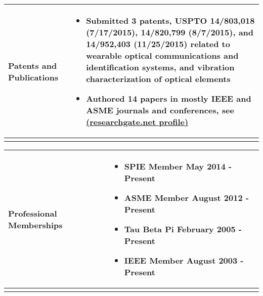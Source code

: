 \documentclass{article}[16pt]
\newlength{\lcolw}
\newlength{\rcolw}
\newlength{\hlcolw}
\newlength{\itemmargin}
\begin{document}
\begin{tabular}{L{\hlcolw}  L{\rcolw}}
\textbf{\Large Patents and Publications} & 
\vspace{-0.3in} 
 \begin{itemize}[leftmargin = \itemmargin]

	\item Submitted 3 patents, USPTO 14/803,018 (7/17/2015), 14/820,799 (8/7/2015), and 14/952,403 (11/25/2015) related to wearable optical communications and identification systems, and vibration characterization of optical elements
	
	\item Authored 14 papers in mostly IEEE and ASME journals and conferences, see \href{https://www.researchgate.net/profile/Kiron_Mateti}{(researchgate.net profile)} 
	\end{itemize} \\
	\hline \\
\end{tabular}
	
\begin{tabular}{L{\hlcolw}  L{\rcolw}}
\textbf{\Large Professional Memberships} & 
\vspace{-0.3in} 
\begin{itemize}[leftmargin = \itemmargin]
\item \textbf{SPIE Member} \hfill May 2014 - Present
\vspace{-0.1in} 
\item \textbf{ASME Member} \hfill August 2012 - Present
\vspace{-0.1in} 
\item \textbf{Tau Beta Pi} \hfill February 2005 - Present
\vspace{-0.1in} 
\item \textbf{IEEE Member} \hfill August 2003 - Present
\end{itemize} \\
\hline \\
\end{tabular}

\end{document}
